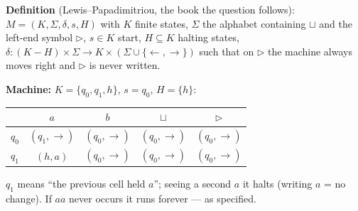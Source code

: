 \documentclass[11pt,a4paper]{article}
\begin{document}
\begin{solution}
\textbf{Definition} (Lewis--Papadimitriou, the book the question follows): $M=(K,\Sigma,\delta,s,H)$ with $K$ finite states, $\Sigma$ the alphabet containing $\sqcup$ and the left-end symbol $\triangleright$, $s\in K$ start, $H\subseteq K$ halting states, $\delta:(K-H)\times\Sigma\to K\times(\Sigma\cup\{\leftarrow,\rightarrow\})$ such that on $\triangleright$ the machine always moves right and $\triangleright$ is never written.

\textbf{Machine:} $K=\{q_0,q_1,h\}$, $s=q_0$, $H=\{h\}$:
\begin{center}\small\begin{tabular}{c|cccc}\toprule & $a$ & $b$ & $\sqcup$ & $\triangleright$\\\midrule
$q_0$ & $(q_1,\rightarrow)$ & $(q_0,\rightarrow)$ & $(q_0,\rightarrow)$ & $(q_0,\rightarrow)$\\
$q_1$ & $(h,a)$ & $(q_0,\rightarrow)$ & $(q_0,\rightarrow)$ & $(q_0,\rightarrow)$\\\bottomrule\end{tabular}\end{center}
$q_1$ means ``the previous cell held $a$''; seeing a second $a$ it halts (writing $a$ = no change). If $aa$ never occurs it runs forever --- as specified.


\end{solution}
\end{document}
